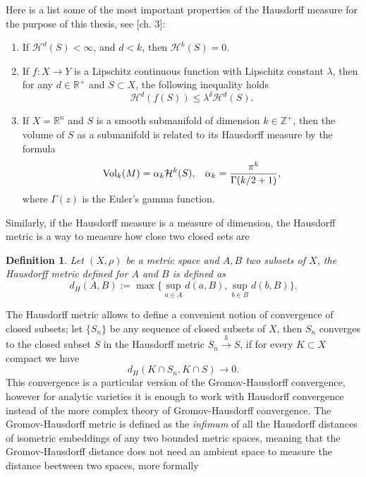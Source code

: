 \documentclass[12pt,twoside,a4paper]{report}
\newtheorem{definition}{Definition}[section]
\newcommand{\zah}{\ensuremath{ \mathbb Z }}
\newcommand{\re}{\ensuremath{\mathbb R }}
\begin{document}
  \noindent Here is a list some of the most important properties of the Hausdorff measure for the purpose of this thesis, see \cite{Stolzenberg}[ch. 3]:

  \begin{enumerate}
          \item[1.] If $\mathcal{H}^d(S)<\infty$, and $d<k$, then $\mathcal{H}^k(S)=0$.\\

          \item[2.] If $f:X\rightarrow Y$ is a Lipschitz continuous function with
          Lipschitz constant $\lambda$, then for any $d\in\re^{+}$ and
          $S\subset X$, the following inequality holds
          \[
          \mathcal{H}^d(f(S))\leq\lambda^{\delta}\mathcal{H}^d(S).
          \]
          \item[3.]If $X=\re^{n}$ and $S$ is a smooth submanifold of dimension
          $k\in\zah^{+}$, then the volume of $S$ as a submanifold is related to
          its Hausdorff measure by the formula
          \[
          \textrm{Vol}_{k}(M)=\alpha_{k}\mathcal{H}^k(S),\hspace*{0.3cm}\alpha_k= \frac{\pi^k}{\Gamma(k/2+1)},
          \]
  \noindent where $\Gamma(z)$ is the Euler's gamma function.
  \end{enumerate}
  Similarly, if the Hausdorff measure is a measure of dimension, the Hausdorff metric is a way to measure how close two closed sets are
  \begin{definition}
  Let $(X,\rho)$ be a metric space and $A,B$ two subsets of $X$, the Hausdorff metric defined for $A$
  and $B$ is defined as
  \[
  d_H(A,B):= \max\Big\{\sup_{a\in A}d(a,B),\sup_{b\in B}d(b,B)\Big\}.
  \]
  \end{definition}
  The Hausdorff metric allows to define a convenient notion of convergence of closed subsets; let $\{S_n \}$ be any sequence of closed subsets of $X$, then $S_n$ converges to the closed subset $S$ in the Hausdorff metric $S_n\overset{h}\rightarrow S$, if for every $K\subset X$ compact we have
  \[
    d_H(K\cap S_n,K\cap S)\rightarrow 0.
  \]
  \noindent This convergence is a particular version of the Gromov-Hausdorff convergence, however for analytic varieties it is enough to work with Hausdorff convergence instead of the more complex theory of Gromov-Hausdorff convergence.
  The Gromov-Hausdorff metric is defined as the \emph{infimum} of all the Hausdorff distances of isometric embeddings of any two bounded metric spaces, meaning that the Gromov-Hausdorff distance does not need an ambient space to measure the distance beetween two spaces, more formally
\end{document}
